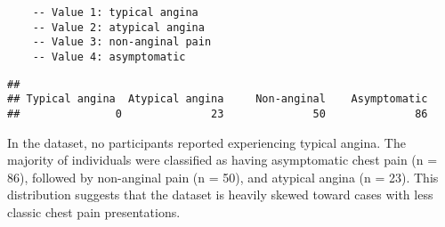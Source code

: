 \documentclass[
]{article}
\newenvironment{Shaded}{\begin{snugshade}}{\end{snugshade}}
\newcommand{\AttributeTok}[1]{\textcolor[rgb]{0.13,0.29,0.53}{#1}}
\newcommand{\DecValTok}[1]{\textcolor[rgb]{0.00,0.00,0.81}{#1}}
\newcommand{\FunctionTok}[1]{\textcolor[rgb]{0.13,0.29,0.53}{\textbf{#1}}}
\newcommand{\NormalTok}[1]{#1}
\newcommand{\OtherTok}[1]{\textcolor[rgb]{0.56,0.35,0.01}{#1}}
\newcommand{\SpecialCharTok}[1]{\textcolor[rgb]{0.81,0.36,0.00}{\textbf{#1}}}
\newcommand{\StringTok}[1]{\textcolor[rgb]{0.31,0.60,0.02}{#1}}
\begin{document}
\begin{verbatim}
    -- Value 1: typical angina
    -- Value 2: atypical angina
    -- Value 3: non-anginal pain
    -- Value 4: asymptomatic
\end{verbatim}

\begin{Shaded}
\end{Shaded}

\begin{verbatim}
## 
## Typical angina  Atypical angina     Non-anginal    Asymptomatic 
##               0              23              50              86
\end{verbatim}

In the dataset, no participants reported experiencing typical angina.
The majority of individuals were classified as having asymptomatic chest
pain (n = 86), followed by non-anginal pain (n = 50), and atypical
angina (n = 23). This distribution suggests that the dataset is heavily
skewed toward cases with less classic chest pain presentations.
\end{document}
